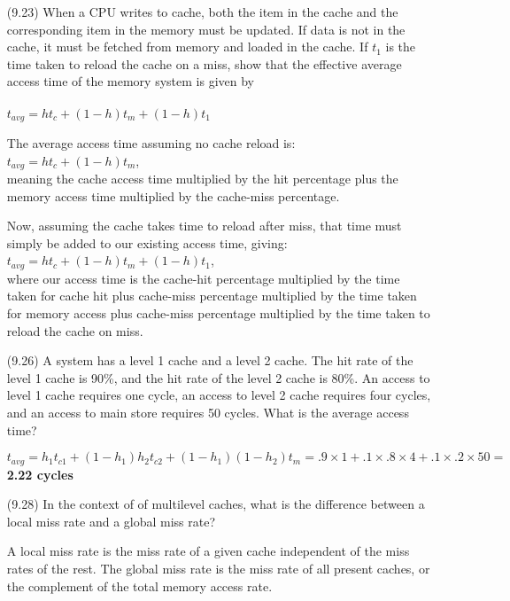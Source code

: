 \documentclass[letterpaper,10pt,titlepage]{article}
\begin{document}
\begin{enumerate}
	\item[(9.23)] When a CPU writes to cache, both the item in the cache and the
		corresponding item in the memory must be updated. If data is not in the
		cache, it must be fetched from memory and loaded in the cache. If $t_{1}$
		is the time taken to reload the cache on a miss, show that the effective
		average access time of the memory system is given by \\ \\
		$t_{avg}=ht_{c}+(1-h)t_{m}+(1-h)t_{1}$
	\item[\textbullet] The average access time assuming no cache reload is:\\
		$t_{avg}=ht_{c}+(1-h)t_{m}$,\\
		meaning the cache access time multiplied by the hit percentage plus the
		memory access time multiplied by the cache-miss percentage.
	\item[\textbullet] Now, assuming the cache takes time to reload after miss, that
		time must simply be added to our existing access time, giving:\\
		$t_{avg}=ht_{c}+(1-h)t_{m}+(1-h)t_{1}$,\\
		where our access time is the cache-hit percentage multiplied by the time
		taken for cache hit plus cache-miss percentage multiplied by the time
		taken for memory access plus cache-miss percentage multiplied by the time
		taken to reload the cache on miss.

	\item[(9.26)] A system has a level 1 cache and a level 2 cache. The hit rate of
		the level 1 cache is 90\%, and the hit rate of the level 2 cache is 80\%.
		An access to level 1 cache requires one cycle, an access to level 2 cache
		requires four cycles, and an access to main store requires 50 cycles. What
		is the average access time?
	\item[\textbullet]
		$t_{avg}=h_{1}t_{c1}+(1-h_{1})h_{2}t_{c2}+(1-h_{1})(1-h_{2})t_{m}=.9\times1+.1\times.8\times4+.1\times.2\times50=$ \textbf{2.22 cycles}

	\item[(9.28)] In the context of of multilevel caches, what is the difference
		between a local miss rate and a global miss rate?
	\item[\textbullet] A local miss rate is the miss rate of a given cache independent
		of the miss rates of the rest. The global miss rate is the miss rate of
		all present caches, or the complement of the total memory access rate.


\end{enumerate}
\end{document}
